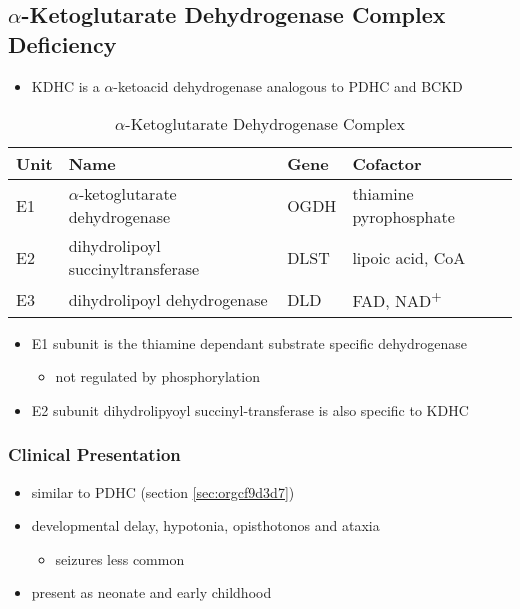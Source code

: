 \documentclass[12pt]{scrartcl}
\begin{document}
\subsection{\(\alpha\)-Ketoglutarate Dehydrogenase Complex Deficiency}
\label{sec:org184cea4}
\begin{itemize}
\item KDHC is a \(\alpha\)-ketoacid dehydrogenase analogous to PDHC and BCKD
\end{itemize}


\begin{table}[htbp]
\caption{\label{tab:org04b6234}\(\alpha\)-Ketoglutarate Dehydrogenase Complex}
\centering
\begin{tabular}{llll}
Unit & Name & Gene & Cofactor\\
\hline
E1 & \(\alpha\)-ketoglutarate dehydrogenase & OGDH & thiamine pyrophosphate\\
E2 & dihydrolipoyl succinyltransferase & DLST & lipoic acid, CoA\\
E3 & dihydrolipoyl dehydrogenase & DLD & FAD, NAD\textsuperscript{+}\\
\end{tabular}
\end{table}

\begin{itemize}
\item E1 subunit is the thiamine dependant substrate specific dehydrogenase
\begin{itemize}
\item not regulated by phosphorylation
\end{itemize}
\item E2 subunit dihydrolipyoyl succinyl-transferase is also specific to KDHC
\end{itemize}

\subsubsection{Clinical Presentation}
\label{sec:org9a7654c}
\begin{itemize}
\item similar to PDHC (section \ref{sec:orgcf9d3d7})
\item developmental delay, hypotonia, opisthotonos and ataxia
\begin{itemize}
\item seizures less common
\end{itemize}
\item present as neonate and early childhood
\end{itemize}
\end{document}

